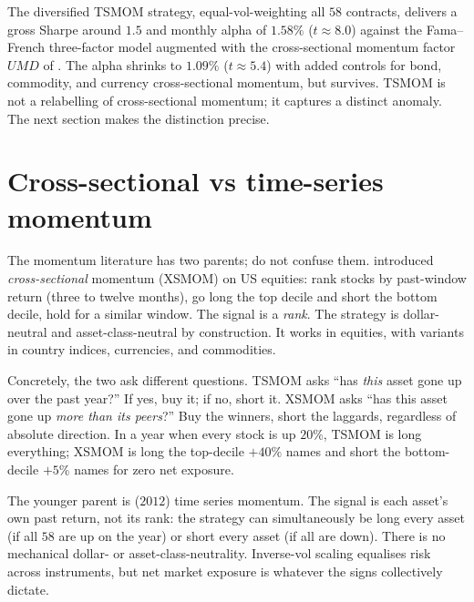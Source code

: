 The diversified TSMOM strategy, equal-vol-weighting all $58$
contracts, delivers a gross Sharpe around $1.5$ and monthly alpha
of $1.58\%$ ($t \approx 8.0$) against the Fama--French three-factor
model augmented with the cross-sectional momentum factor
$\textit{UMD}$ of \citet{jegadeesh1993}. The alpha shrinks to
$1.09\%$ ($t \approx 5.4$) with added controls for bond,
commodity, and currency cross-sectional momentum, but survives.
TSMOM is not a relabelling of cross-sectional momentum; it
captures a distinct anomaly. The next section makes the
distinction precise.

\section{Cross-sectional vs time-series momentum}
\label{sec:ch12_cross_vs_ts}

The momentum literature has two parents; do not confuse them.
\citet{jegadeesh1993} introduced \emph{cross-sectional} momentum
(XSMOM) on US equities: rank stocks by past-window return (three
to twelve months), go long the top decile and short the bottom
decile, hold for a similar window. The signal is a \emph{rank}.
The strategy is dollar-neutral and asset-class-neutral by
construction. It works in equities, with variants in country
indices, currencies, and commodities.

Concretely, the two ask different questions. TSMOM asks ``has
\emph{this} asset gone up over the past year?'' If yes, buy
it; if no, short it. XSMOM asks ``has this asset gone up
\emph{more than its peers}?'' Buy the winners, short the
laggards, regardless of absolute direction. In a year when every
stock is up $20\%$, TSMOM is long everything; XSMOM is long the
top-decile $+40\%$ names and short the bottom-decile $+5\%$ names
for zero net exposure.

The younger parent is \citeMOP ($2012$) time series momentum. The
signal is each asset's own past return, not its rank: the strategy
can simultaneously be long every asset (if all $58$ are up on the
year) or short every asset (if all are down). There is no
mechanical dollar- or asset-class-neutrality. Inverse-vol scaling
equalises risk across instruments, but net market exposure is
whatever the signs collectively dictate.

